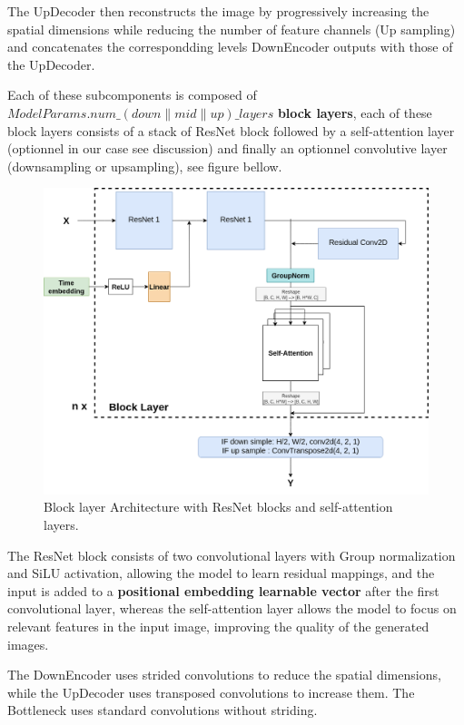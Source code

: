 \documentclass[twocolumn,superscriptaddress,aps]{revtex4-1}
\begin{document}
The UpDecoder then reconstructs the image by progressively increasing the spatial dimensions while reducing the number of feature channels (Up sampling) and concatenates the correspondding levels DownEncoder outputs with those of the UpDecoder.

Each of these subcomponents is composed of \small{$ModelParams.num\_(down\|mid\|up)\_layers$} \textbf{block layers}, each of these block layers consists of a stack of ResNet block followed by a self-attention layer (optionnel in our case see discussion) and finally an optionnel convolutive layer (downsampling or upsampling), see figure bellow.

\begin{figure}[ht]
  \centering
  \includegraphics[width=\textwidth]{figures/block_layer.png}
  \caption{Block layer Architecture with ResNet blocks and self-attention layers.}
  \label{fig:unet_architecture}
\end{figure}

The ResNet block consists of two convolutional layers with Group normalization and SiLU activation, allowing the model to learn residual mappings, and the input is added to a \textbf{positional embedding learnable vector} after the first convolutional layer, whereas the self-attention layer allows the model to focus on relevant features in the input image, improving the quality of the generated images.

The DownEncoder uses strided convolutions to reduce the spatial dimensions, while the UpDecoder uses transposed convolutions to increase them. The Bottleneck uses standard convolutions without striding.
\end{document}
